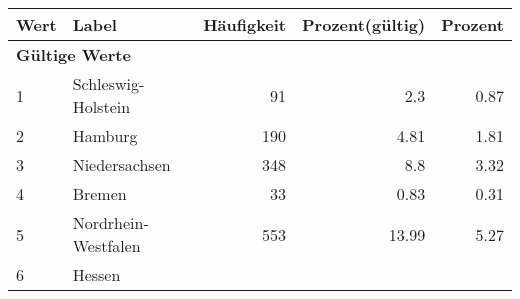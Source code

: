      \begin{longtable}{lXrrr}
     \toprule
     \textbf{Wert} & \textbf{Label} & \textbf{Häufigkeit} & \textbf{Prozent(gültig)} & \textbf{Prozent} \\
     \endhead
     \midrule
     \multicolumn{5}{l}{\textbf{Gültige Werte}}\\

     1 &
     \multicolumn{1}{X}{ Schleswig-Holstein   } &


       \num{91} &
       \num[round-mode=places,round-precision=2]{2.3} &
         \num[round-mode=places,round-precision=2]{0.87} \\

     2 &
     \multicolumn{1}{X}{ Hamburg   } &


       \num{190} &
       \num[round-mode=places,round-precision=2]{4.81} &
         \num[round-mode=places,round-precision=2]{1.81} \\

     3 &
     \multicolumn{1}{X}{ Niedersachsen   } &


       \num{348} &
       \num[round-mode=places,round-precision=2]{8.8} &
         \num[round-mode=places,round-precision=2]{3.32} \\

     4 &
     \multicolumn{1}{X}{ Bremen   } &


       \num{33} &
       \num[round-mode=places,round-precision=2]{0.83} &
         \num[round-mode=places,round-precision=2]{0.31} \\

     5 &
     \multicolumn{1}{X}{ Nordrhein-Westfalen   } &


       \num{553} &
       \num[round-mode=places,round-precision=2]{13.99} &
         \num[round-mode=places,round-precision=2]{5.27} \\

     6 &
     \multicolumn{1}{X}{ Hessen   } &



\end{longtable}

